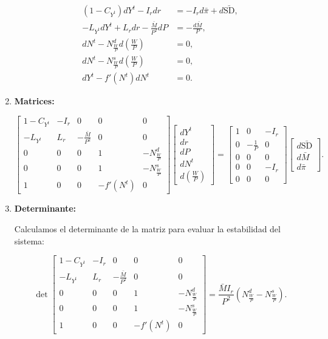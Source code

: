 \documentclass[
  doc,
  floatsintext,
  longtable,
  a4paper,
  nolmodern,
  notxfonts,
  notimes,
  colorlinks=true,linkcolor=blue,citecolor=blue,urlcolor=blue]{apa7}
\begin{document}
\begin{enumerate}
  \[
  \begin{aligned}
  (1 - C_{Y^t}) dY^t - I_r dr &= -I_r d\bar{\pi} + d\bar{\mathrm{SD}}, \\
  -L_{Y^t} dY^t + L_r dr - \frac{\bar{M}}{P^2} dP &= -\frac{d\bar{M}}{P}, \\
  dN^t - N^d_{\frac{W}{P}} d \left( \frac{W}{P} \right) &= 0, \\
  dN^t - N^s_{\frac{W}{P}} d \left( \frac{W}{P} \right) &= 0, \\
  dY^t - f'(N^t) dN^t &= 0.
  \end{aligned}
  \]
\item
  \textbf{Matrices:}

  \[
  \begin{bmatrix}
  1 - C_{Y^t} & -I_r & 0 & 0 & 0 \\
  -L_{Y^t} & L_r & -\frac{\bar{M}}{P^2} & 0 & 0 \\
  0 & 0 & 0 & 1 & -N^d_{\frac{W}{P}} \\
  0 & 0 & 0 & 1 & -N^s_{\frac{W}{P}} \\
  1 & 0 & 0 & -f'(N^t) & 0
  \end{bmatrix}
  \begin{bmatrix}
  dY^t \\
  dr \\
  dP \\
  dN^t \\
  d \left( \frac{W}{P} \right)
  \end{bmatrix}
  =
  \begin{bmatrix}
  1 & 0 & -I_r \\
  0 & -\frac{1}{P} & 0 \\
  0 & 0 & 0 \\
  0 & 0 &-I_r \\
  0 & 0 & 0
  \end{bmatrix}
  \begin{bmatrix}
  d\bar{\mathrm{SD}} \\
  d\bar{M} \\
  d\bar{\pi}
  \end{bmatrix}.
  \]
\item
  \textbf{Determinante:}

  Calculamos el determinante de la matriz para evaluar la estabilidad
  del sistema:

  \[
  \det \begin{bmatrix}
  1 - C_{Y^t} & -I_r & 0 & 0 & 0 \\
  -L_{Y^t} & L_r & -\frac{\bar{M}}{P^2} & 0 & 0 \\
  0 & 0 & 0 & 1 & -N^d_{\frac{W}{P}} \\
  0 & 0 & 0 & 1 & -N^s_{\frac{W}{P}} \\
  1 & 0 & 0 & -f'(N^t) & 0
  \end{bmatrix} = \frac{\bar{M} I_r}{P^2} \left( N^d_{\frac{W}{P}} - N^s_{\frac{W}{P}} \right).
  \]


\end{enumerate}
\end{document}
